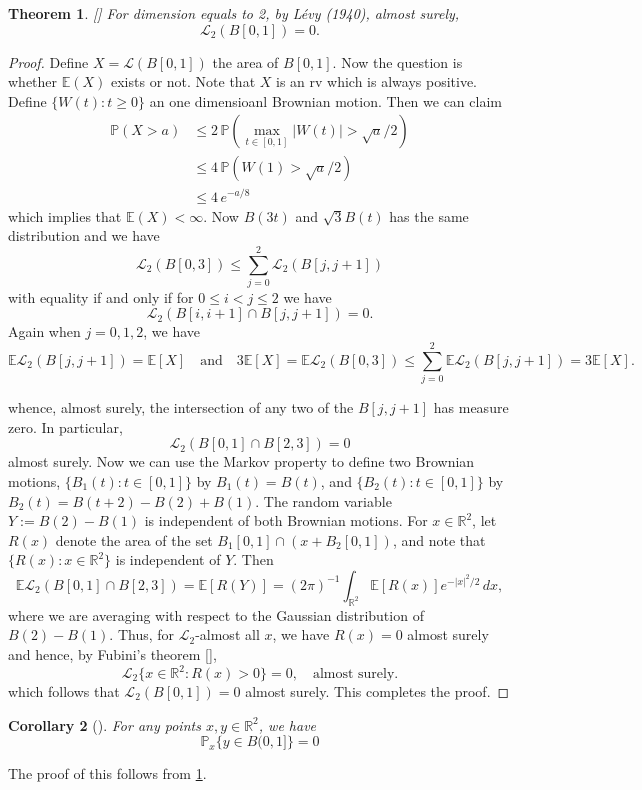 \documentclass[11pt, a4paper, oneside]{report}
\numberwithin{equation}{section}
\newtheorem{theorem}{Theorem}[chapter]
\newtheorem{corollary}[theorem]{Corollary}
\begin{document}
\begin{theorem}\label{levy}[{\cite[Theorem 2.24]{PeresMortersBook}}]
For dimension equals to 2, by L\'evy (1940), almost surely,
\[
\mathcal{L}_2(B[0,1]) = 0.
\]
\end{theorem}
\begin{proof}
Define \(X =\mathcal{L}(B[0,1])\) the area of $B[0,1]$.
Now the question is whether $\mathbb{E}(X)$ exists or not. Note that $X$ is an rv which is always positive. Define $\{W(t) : t \geq 0\}$ an one dimensioanl Brownian motion. Then we can claim 
\begin{align*}
\mathbb{P}(X > a) 
&\leq 2\, \mathbb{P} \left( \max_{t \in [0,1]} |W(t)| > \sqrt{a}/2 \right) \\
& \leq 4\, \mathbb{P} \left( W(1) > \sqrt{a}/2 \right) \\
&\leq 4\, e^{-a/8}
\end{align*}
which implies that $\mathbb{E}(X) < \infty$.
Now $B(3t)$ and $\sqrt{3}B(t)$ has the same distribution and we have 
\[
\mathcal{L}_2(B[0,3]) \leq \sum_{j=0}^{2} \mathcal{L}_2(B[j, j+1])
\]
with equality if and only if for 
\(0 \leq i < j \leq 2\) we have 
\[
\mathcal{L}_2(B[i, i+1] \cap B[j, j+1]) = 0.
\]
Again when \(j = 0,1,2\), we have 
\[
\mathbb{E}\mathcal{L}_2(B[j, j+1]) = \mathbb{E}[X]
\quad \text{and} \quad
3\mathbb{E}[X] = \mathbb{E}\mathcal{L}_2(B[0,3]) \leq \sum_{j=0}^{2} \mathbb{E}\mathcal{L}_2(B[j, j+1]) = 3\mathbb{E}[X].
\]

\noindent
whence, almost surely, the intersection of any two of the \(B[j, j+1]\) has measure zero. In particular, 
\[
\mathcal{L}_2(B[0,1] \cap B[2,3]) = 0
\]
almost surely.
Now we can use the Markov property to define two Brownian motions, $\{B_1(t) : t \in [0,1]\}$ by \(B_1(t) = B(t)\), and 
$\{B_2(t) : t \in [0,1]\}$ by 
$
B_2(t) = B(t+2) - B(2) + B(1).
$
The random variable \(Y := B(2) - B(1)\) is independent of both Brownian motions. For \(x \in \mathbb{R}^2\), let \(R(x)\) denote the area of the set \(B_1[0,1] \cap (x + B_2[0,1])\), and note that \(\{ R(x) : x \in \mathbb{R}^2 \}\) is independent of \(Y\). Then
\[
\mathbb{E}\mathcal{L}_2(B[0,1] \cap B[2,3]) = \mathbb{E}[R(Y)] = (2\pi)^{-1} \int_{\mathbb{R}^2} \mathbb{E}[R(x)] e^{-|x|^2/2} \, dx,
\]
where we are averaging with respect to the Gaussian distribution of \(B(2) - B(1)\). Thus, for \(\mathcal{L}_2\)-almost all \(x\), we have \(R(x) = 0\) almost surely and hence, by Fubini’s theorem [{\cite[pp. 105 - 112]{MR1810041}}],
\[
\mathcal{L}_2\{ x \in \mathbb{R}^2 : R(x) > 0 \} = 0, \quad \text{almost surely.}
\]
which follows that $\mathcal{L}_2(B[0,1]) = 0$ almost surely. This completes the proof.



\end{proof}
\begin{corollary}[{\cite[Corollary 2.26]{PeresMortersBook}}]
For any points \(x, y \in \mathbb{R}^2\), we have
\[
\mathbb{P}_x\{ y \in B(0, 1] \} = 0
\]

\end{corollary}
The proof of this follows from \ref{levy}.
\end{document}
